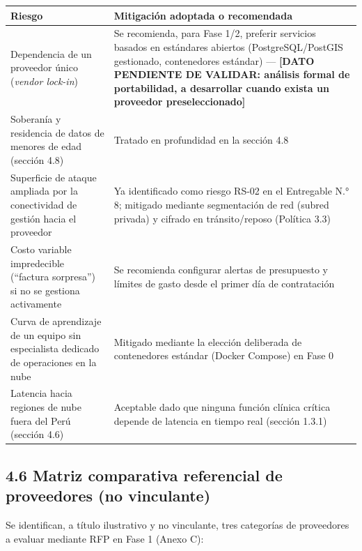 \documentclass[11pt,a4paper]{article}
\begin{document}
{\small
\begin{longtable}[]{@{}
  >{\raggedright\arraybackslash}p{}
  >{\raggedright\arraybackslash}p{}@{}}
\toprule\noalign{}
\begin{minipage}[b]{\linewidth}\raggedright
Riesgo
\end{minipage} & \begin{minipage}[b]{\linewidth}\raggedright
Mitigación adoptada o recomendada
\end{minipage} \\
\midrule\noalign{}
\endhead
\bottomrule\noalign{}
\endlastfoot
Dependencia de un proveedor único (\emph{vendor lock-in}) & Se recomienda, para Fase 1/2, preferir servicios basados en estándares abiertos (PostgreSQL/PostGIS gestionado, contenedores estándar) --- \textbf{{[}DATO PENDIENTE DE VALIDAR: análisis formal de portabilidad, a desarrollar cuando exista un proveedor preseleccionado{]}} \\
Soberanía y residencia de datos de menores de edad (sección 4.8) & Tratado en profundidad en la sección 4.8 \\
Superficie de ataque ampliada por la conectividad de gestión hacia el proveedor & Ya identificado como riesgo RS-02 en el Entregable N.° 8; mitigado mediante segmentación de red (subred privada) y cifrado en tránsito/reposo (Política 3.3) \\
Costo variable impredecible (``factura sorpresa'') si no se gestiona activamente & Se recomienda configurar alertas de presupuesto y límites de gasto desde el primer día de contratación \\
Curva de aprendizaje de un equipo sin especialista dedicado de operaciones en la nube & Mitigado mediante la elección deliberada de contenedores estándar (Docker Compose) en Fase 0 \\
Latencia hacia regiones de nube fuera del Perú (sección 4.6) & Aceptable dado que ninguna función clínica crítica depende de latencia en tiempo real (sección 1.3.1) \\
\end{longtable}
}

\subsection{4.6 Matriz comparativa referencial de proveedores (no vinculante)}\label{matriz-comparativa-referencial-de-proveedores-no-vinculante}

Se identifican, a título ilustrativo y no vinculante, tres categorías de proveedores a evaluar mediante RFP en Fase 1 (Anexo C):
\end{document}
